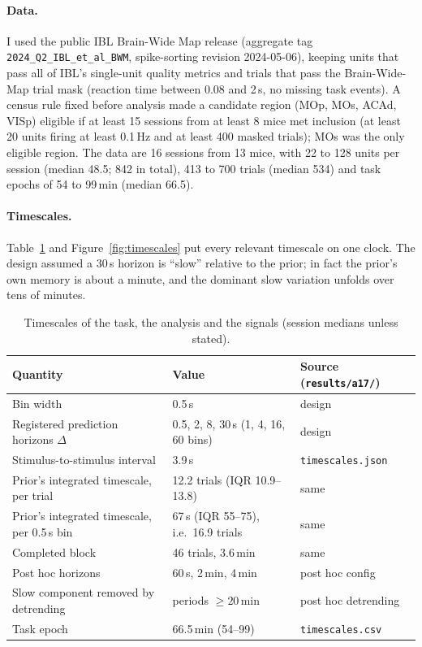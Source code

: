 \documentclass{article}
\begin{document}
\paragraph{Data.} I used the public IBL Brain-Wide Map release \citep{ibl2025bwm} (aggregate tag
\texttt{2024\_Q2\_IBL\_et\_al\_BWM}, spike-sorting revision 2024-05-06), keeping units that pass all of IBL's
single-unit quality metrics \citep{iblrepro2025} and trials that pass the Brain-Wide-Map trial mask (reaction time
between 0.08 and 2\,s, no missing task events). A census rule fixed before analysis made a candidate region (MOp, MOs,
ACAd, VISp) eligible if at least 15 sessions from at least 8 mice met inclusion (at least 20 units firing at least
0.1\,Hz and at least 400 masked trials); MOs was the only eligible region. The data are 16 sessions from 13 mice, with
22 to 128 units per session (median 48.5; 842 in total), 413 to 700 trials (median 534) and task epochs of 54 to
99\,min (median 66.5).

\paragraph{Timescales.} Table~\ref{tab:timescales} and Figure~\ref{fig:timescales} put every relevant timescale on
one clock. The design assumed a 30\,s horizon is ``slow'' relative to the prior; in fact the prior's own memory is
about a minute, and the dominant slow variation unfolds over tens of minutes.

\begin{table}[t]
  \caption{Timescales of the task, the analysis and the signals (session medians unless stated).}
  \label{tab:timescales}
  \centering\small
  \begin{tabular}{lll}
    \toprule
    Quantity & Value & Source (\texttt{results/a17/}) \\
    \midrule
    Bin width & 0.5\,s & design \\
    Registered prediction horizons $\Delta$ & 0.5, 2, 8, 30\,s (1, 4, 16, 60 bins) & design \\
    Stimulus-to-stimulus interval & 3.9\,s & \texttt{timescales.json} \\
    Prior's integrated timescale, per trial & 12.2 trials (IQR 10.9--13.8) & same \\
    Prior's integrated timescale, per 0.5\,s bin & 67\,s (IQR 55--75), i.e.\ 16.9 trials & same \\
    Completed block & 46 trials, 3.6\,min & same \\
    Post hoc horizons & 60\,s, 2\,min, 4\,min & post hoc config \\
    Slow component removed by detrending & periods $\ge 20$\,min & post hoc detrending \\
    Task epoch & 66.5\,min (54--99) & \texttt{timescales.csv} \\
    \bottomrule
  \end{tabular}
\end{table}
\end{document}
